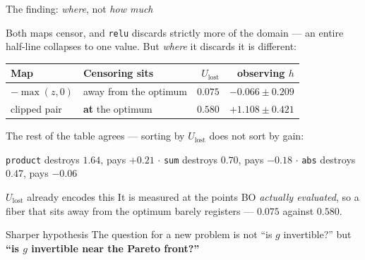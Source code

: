 \documentclass[aspectratio=169,11pt]{beamer}
\newcommand{\Ulost}{U_{\text{lost}}}
\newcommand{\good}{\textcolor{green!50!black}}
\begin{document}
\begin{frame}[shrink=12]{The finding: \emph{where}, not \emph{how much}}

Both maps censor, and \texttt{relu} discards strictly more of the domain
--- an entire half-line collapses to one value. But \emph{where} it discards it
is different:

\begin{center}
\begin{tabular}{llrr}
\toprule
Map & Censoring sits & $\Ulost$ & observing $h$ \\
\midrule
$-\max(z,0)$ & away from the optimum & $0.075$ & \good{$-0.066\pm0.209$} \\
clipped pair & \textbf{at} the optimum & $0.580$ & \good{$+1.108\pm0.421$} \\
\bottomrule
\end{tabular}
\end{center}

\bigskip
The rest of the table agrees --- sorting by $\Ulost$ does not sort by gain:

\begin{center}
\small
\texttt{product} destroys $1.64$, pays $+0.21$ \quad$\cdot$\quad
\texttt{sum} destroys $0.70$, pays $-0.18$ \quad$\cdot$\quad
\texttt{abs} destroys $0.47$, pays $-0.06$
\end{center}

\bigskip
\begin{block}{$\Ulost$ already encodes this}
It is measured at the points BO \emph{actually evaluated}, so a fiber that sits away from the optimum barely registers --- $0.075$ against $0.580$.
\end{block}

\begin{block}{Sharper hypothesis}
The question for a new problem is not ``is $g$ invertible?'' but
\textbf{``is $g$ invertible near the Pareto front?''}
\end{block}

\end{frame}
\end{document}
